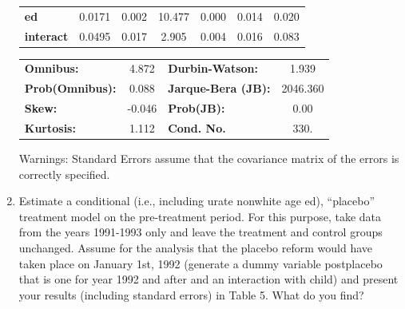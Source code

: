 \documentclass{article}
\begin{document}
\begin{enumerate}[label=\alph*]
\begin{center}
\begin{tabular}{lcccccc}
\textbf{ed}       &       0.0171  &        0.002     &    10.477  &         0.000        &        0.014    &        0.020     \\
\textbf{interact} &       0.0495  &        0.017     &     2.905  &         0.004        &        0.016    &        0.083     \\
\bottomrule
\end{tabular}
\begin{tabular}{lclc}
\textbf{Omnibus:}       &  4.872 & \textbf{  Durbin-Watson:     } &    1.939  \\
\textbf{Prob(Omnibus):} &  0.088 & \textbf{  Jarque-Bera (JB):  } & 2046.360  \\
\textbf{Skew:}          & -0.046 & \textbf{  Prob(JB):          } &     0.00  \\
\textbf{Kurtosis:}      &  1.112 & \textbf{  Cond. No.          } &     330.  \\
\bottomrule
\end{tabular}
\end{center}

Warnings: \newline
 [1] Standard Errors assume that the covariance matrix of the errors is correctly specified.


\item Estimate a conditional (i.e., including urate nonwhite age ed), “placebo” treatment model on the pre-treatment period. For this purpose, take data from the years 1991-1993 only and leave the treatment and control groups unchanged. Assume for the analysis that the placebo reform would have taken place on January 1st, 1992 (generate a dummy variable postplacebo that is one for year 1992 and after and an interaction with child) and present your results (including standard errors) in Table 5. What do you find?


\end{enumerate}
\end{document}
